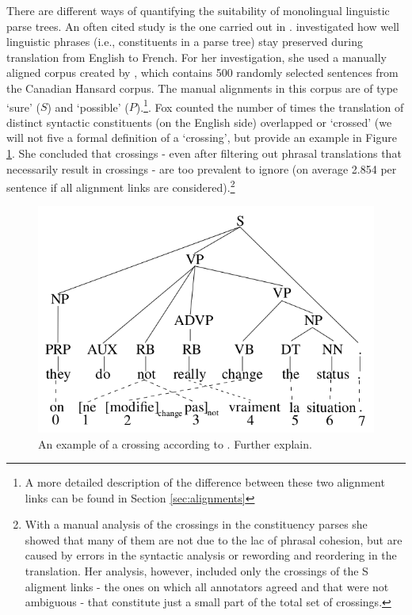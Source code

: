 \documentclass{report}
\theoremstyle{break}
\begin{document}
There are different ways of quantifying the suitability of monolingual linguistic parse trees. An often cited study is the one carried out in \cite{fox2002phrasal}. \citeauthor{fox2002phrasal} investigated how well linguistic phrases (i.e., constituents in a parse tree) stay preserved during translation from English to French. For her investigation, she used a manually aligned corpus created by \cite{och2000improved}, which contains 500 randomly selected sentences from the Canadian Hansard corpus. The manual alignments in this corpus are of type `sure' ($S$) and `possible' ($P$).\footnote{A more detailed description of the difference between these two alignment links can be found in Section \ref{sec:alignments}}. Fox counted the number of times the translation of distinct syntactic constituents (on the English side) overlapped or `crossed' (we will not five a formal definition of a `crossing', but provide an example in Figure \ref{fig:fox}. She concluded that crossings - even after filtering out phrasal translations that necessarily result in crossings - are too prevalent to ignore (on average 2.854 per sentence if all alignment links are considered).\footnote{With a manual analysis of the crossings in the constituency parses she showed that many of them are not due to the lac of phrasal cohesion, but are caused by errors in the syntactic analysis or rewording and reordering in the translation. Her analysis, however, included only the crossings of the S aligment links - the ones on which all annotators agreed and that were not ambiguous - that constitute just a small part of the total set of crossings.}


\begin{figure}[!ht]
\centering
\includegraphics[scale=0.4]{crossing.png}
\caption{An example of a crossing according to \cite{fox2002phrasal}. Further explain.}\label{fig:fox}
\end{figure}
\end{document}
